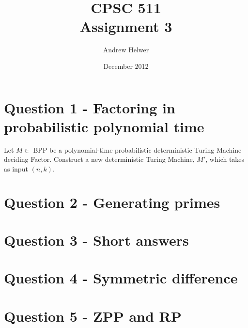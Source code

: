 \documentclass{article}
\begin{document}
\title{CPSC 511 \\ Assignment 3}
\author{Andrew Helwer}
\date{December 2012}
\maketitle

\section{Question 1 - Factoring in probabilistic polynomial time}

Let $M \in$ BPP be a polynomial-time probabilistic deterministic Turing Machine deciding Factor.
Construct a new deterministic Turing Machine, $M'$, which takes as input $(n, k)$.


\section{Question 2 - Generating primes}

\section{Question 3 - Short answers}

\section{Question 4 - Symmetric difference}

\section{Question 5 - ZPP and RP}
\end{document}
